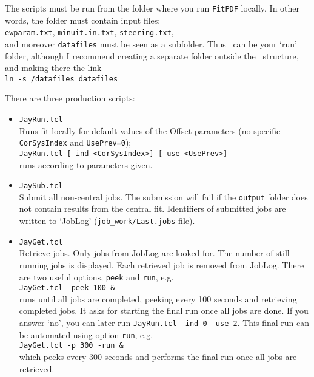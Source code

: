 The scripts must be run from the folder where you run \texttt{FitPDF} locally. 
In other words, the folder must contain input files:\\
\texttt{ewparam.txt},
\texttt{minuit.in.txt},
\texttt{steering.txt},\\
and moreover 
\texttt{datafiles} must be seen as a subfolder. 
Thus \HF\ can be your `run' folder, although I recommend creating a separate folder 
outside the \fitter\ structure, and making there the link\\
\texttt{ln -s \HF/datafiles datafiles}

There are three production scripts:
\begin{itemize}
\item \texttt{JayRun.tcl}\\
Runs fit locally for default values of the Offset parameters
(no specific \verb'CorSysIndex' and \verb'UsePrev=0');\\
\verb'JayRun.tcl [-ind <CorSysIndex>] [-use <UsePrev>]'\\
runs according to parameters given.

\item \texttt{JaySub.tcl}\\
Submit all non-central jobs.
The submission will fail if the \verb'output' folder
does not contain results from the central fit.
Identifiers of submitted jobs are written to `JobLog' (\verb'job_work/Last.jobs' file).

\item \texttt{JayGet.tcl}\\
Retrieve jobs. Only jobs from JobLog are looked for.
The number of still running jobs is displayed. 
Each retrieved job is removed from JobLog.
There are two useful options, \texttt{peek} and \texttt{run}, e.g.\\
\verb'JayGet.tcl -peek 100 &'\\
runs until all jobs are completed, peeking every 100 seconds and retrieving completed jobs.
It asks for starting the final run once all jobs are done.
If you answer `no', you can later run \verb'JayRun.tcl -ind 0 -use 2'.
This final run can be automated using option \texttt{run}, e.g.\\
\verb'JayGet.tcl -p 300 -run &'\\
which peeks every 300 seconds and performs the final run once all jobs are retrieved.
\end{itemize}

